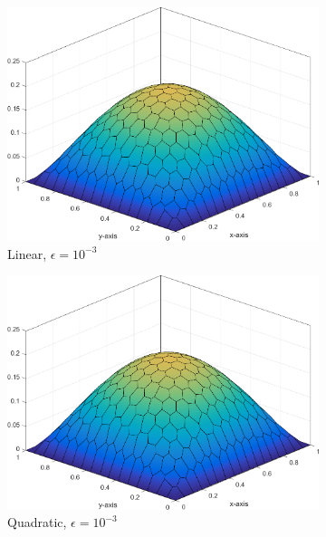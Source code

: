 \begin{figure}
{	\begin{subfigure}[b]{0.465\textwidth}
		\centering
		\label{subfig::DL_trans_w1_e3}
		\includegraphics[width=\textwidth]{figures/sec_BF/Sq_poly_WACHSPRESS_k=1_ep=1e-3.png}
		\caption{Linear, $\epsilon = 10^{-3}$}
	\end{subfigure}
	\hfill
	\begin{subfigure}[b]{0.465\textwidth}
		\centering
		\label{subfig::DL_trans_w2_e3}
		\includegraphics[width=\textwidth]{figures/sec_BF/Sq_poly_WACHSPRESS_k=2_ep=1e-3.png}
		\caption{Quadratic, $\epsilon = 10^{-3}$}
	\end{subfigure}
}
{
	\vspace{3mm}
	\begin{subfigure}[b]{0.465\textwidth}

\end{subfigure}}
\end{figure}
